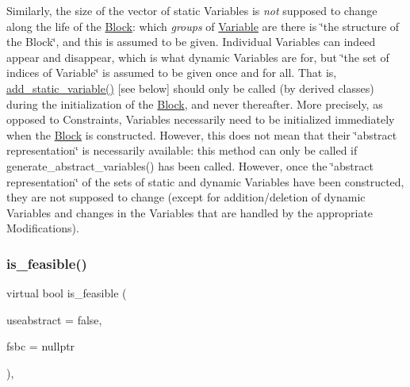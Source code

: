 Similarly, the size of the vector of static Variables is {\itshape not} supposed to change along the life of the \mbox{\hyperlink{class_s_m_spp__di__unipi__it_1_1_block}{Block}}\+: which {\itshape groups} of \mbox{\hyperlink{class_s_m_spp__di__unipi__it_1_1_variable}{Variable}} are there is \char`\"{}the structure of the Block\char`\"{}, and this is assumed to be given. Individual Variables can indeed appear and disappear, which is what dynamic Variables are for, but \char`\"{}the set of indices of Variable\char`\"{} is assumed to be given once and for all. That is, \mbox{\hyperlink{class_s_m_spp__di__unipi__it_1_1_block_ab8247ae8b4fca28c044253ac5f0779c9}{add\+\_\+static\+\_\+variable()}} \mbox{[}see below\mbox{]} should only be called (by derived classes) during the initialization of the \mbox{\hyperlink{class_s_m_spp__di__unipi__it_1_1_block}{Block}}, and never thereafter. More precisely, as opposed to Constraints, Variables necessarily need to be initialized immediately when the \mbox{\hyperlink{class_s_m_spp__di__unipi__it_1_1_block}{Block}} is constructed. However, this does not mean that their \char`\"{}abstract representation\char`\"{} is necessarily available\+: this method can only be called if generate\+\_\+abstract\+\_\+variables() has been called. However, once the \char`\"{}abstract representation\char`\"{} of the sets of static and dynamic Variables have been constructed, they are not supposed to change (except for addition/deletion of dynamic Variables and changes in the Variables that are handled by the appropriate Modifications). \mbox{\label{class_s_m_spp__di__unipi__it_1_1_block_a4204ffb542117f4ea97eeceeda4da079}} 
\subsubsection{\texorpdfstring{is\+\_\+feasible()}{is\_feasible()}}
{\footnotesize\ttfamily virtual bool is\+\_\+feasible (\begin{DoxyParamCaption}\item[{bool}]{useabstract = {\ttfamily false},  }\item[{\mbox{\hyperlink{class_s_m_spp__di__unipi__it_1_1_configuration}{Configuration}} $\ast$}]{fsbc = {\ttfamily nullptr} }\end{DoxyParamCaption})\hspace{0.3cm}{\ttfamily [inline]}, {\ttfamily [virtual]}}



